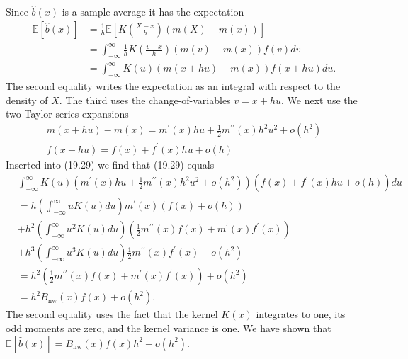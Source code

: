 \documentclass[10pt]{article}
\begin{document}
Since $\widehat{b}(x)$ is a sample average it has the expectation
$$
\begin{aligned}
\mathbb{E}[\widehat{b}(x)] &=\frac{1}{h} \mathbb{E}\left[K\left(\frac{X-x}{h}\right)(m(X)-m(x))\right] \\
&=\int_{-\infty}^{\infty} \frac{1}{h} K\left(\frac{v-x}{h}\right)(m(v)-m(x)) f(v) d v \\
&=\int_{-\infty}^{\infty} K(u)(m(x+h u)-m(x)) f(x+h u) d u .
\end{aligned}
$$
The second equality writes the expectation as an integral with respect to the density of $X$. The third uses the change-of-variables $v=x+h u$. We next use the two Taylor series expansions
$$
\begin{gathered}
m(x+h u)-m(x)=m^{\prime}(x) h u+\frac{1}{2} m^{\prime \prime}(x) h^{2} u^{2}+o\left(h^{2}\right) \\
f(x+h u)=f(x)+f^{\prime}(x) h u+o(h)
\end{gathered}
$$
Inserted into (19.29) we find that (19.29) equals
$$
\begin{aligned}
&\int_{-\infty}^{\infty} K(u)\left(m^{\prime}(x) h u+\frac{1}{2} m^{\prime \prime}(x) h^{2} u^{2}+o\left(h^{2}\right)\right)\left(f(x)+f^{\prime}(x) h u+o(h)\right) d u \\
&=h\left(\int_{-\infty}^{\infty} u K(u) d u\right) m^{\prime}(x)(f(x)+o(h)) \\
&+h^{2}\left(\int_{-\infty}^{\infty} u^{2} K(u) d u\right)\left(\frac{1}{2} m^{\prime \prime}(x) f(x)+m^{\prime}(x) f^{\prime}(x)\right) \\
&+h^{3}\left(\int_{-\infty}^{\infty} u^{3} K(u) d u\right) \frac{1}{2} m^{\prime \prime}(x) f^{\prime}(x)+o\left(h^{2}\right) \\
&=h^{2}\left(\frac{1}{2} m^{\prime \prime}(x) f(x)+m^{\prime}(x) f^{\prime}(x)\right)+o\left(h^{2}\right) \\
&=h^{2} B_{\mathrm{nw}}(x) f(x)+o\left(h^{2}\right) .
\end{aligned}
$$
The second equality uses the fact that the kernel $K(x)$ integrates to one, its odd moments are zero, and the kernel variance is one. We have shown that $\mathbb{E}[\widehat{b}(x)]=B_{\mathrm{nw}}(x) f(x) h^{2}+o\left(h^{2}\right)$.
\end{document}
